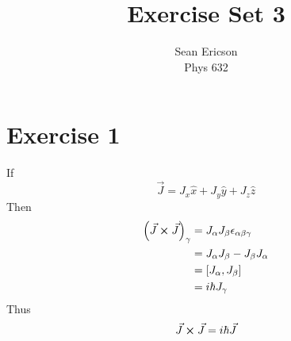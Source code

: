 \documentclass[12pt]{article}
\begin{document}
	
\title{Exercise Set 3}
\author{Sean Ericson \\ Phys 632}
\maketitle

\section*{Exercise 1}
If 
\[ \vec{J} = J_x\hat{x} + J_y\hat{y} + J_z\hat{z} \]
Then
\begin{align*}
    \left(\vec{J}\cross\vec{J}\right)_\gamma & = J_\alpha J_\beta \epsilon_{\alpha\beta\gamma} \\
    & = J_\alpha J_\beta - J_\beta J_\alpha \\
    & = \comm{J_\alpha}{J_\beta} \\
    & = i\hbar J_\gamma
\end{align*}
Thus
\[ \vec{J}\cross\vec{J} = i\hbar\vec{J} \]
\end{document}
